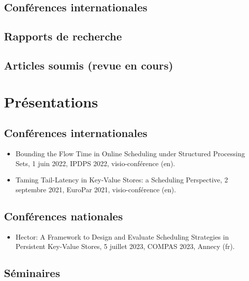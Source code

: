 \documentclass[12pt]{article}
\begin{document}
\subsection*{Conférences internationales}


\subsection*{Rapports de recherche}


\subsection*{Articles soumis (revue en cours)}


\section*{Présentations}

\subsection*{Conférences internationales}

\begin{itemize}
  \item \foreignlanguage{english}{Bounding the Flow Time in Online Scheduling under Structured
  Processing Sets}, 1 juin 2022, IPDPS 2022, visio-conférence (en).
  \item \foreignlanguage{english}{Taming Tail-Latency in Key-Value Stores: a Scheduling
  Perspective}, 2 septembre 2021, EuroPar 2021, visio-conférence (en).
\end{itemize}

\subsection*{Conférences nationales}

\begin{itemize}
  \item \foreignlanguage{english}{Hector: A Framework to Design and Evaluate Scheduling Strategies
  in Persistent Key-Value Stores}, 5 juillet 2023, COMPAS 2023, Annecy (fr).
\end{itemize}

\subsection*{Séminaires}
\end{document}

